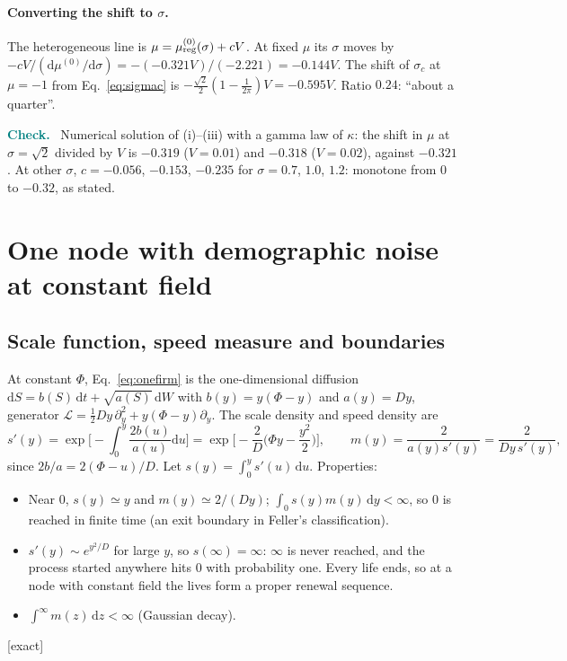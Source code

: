 \documentclass[11pt]{article}
\newcommand{\dd}{\mathrm d}
\newcommand{\exact}{\textsf{\small[exact]}}
\newenvironment{verify}{\par\medskip\noindent\textcolor{teal}{\textbf{Check.}}\ }{\par\medskip}
\begin{document}
\paragraph{Converting the shift to $\sigma$.}  The heterogeneous line is $\mu=\mu^{(0)}_{\rm reg}(\sigma)+cV$.  At fixed $\mu$ its $\sigma$
moves by $-cV/(\dd\mu^{(0)}/\dd\sigma)=-(-0.321V)/(-2.221)=-0.144V$.  The shift of $\sigma_c$ at $\mu=-1$ from Eq.~\eqref{eq:sigmac} is
$-\tfrac{\sqrt2}2(1-\tfrac1{2\pi})V=-0.595V$.  Ratio $0.24$: ``about a quarter''.

\begin{verify}
Numerical solution of (i)--(iii) with a gamma law of $\kappa$: the shift in $\mu$ at $\sigma=\sqrt2$ divided by $V$ is $-0.319$
($V=0.01$) and $-0.318$ ($V=0.02$), against $-0.321$.  At other $\sigma$, $c=-0.056$, $-0.153$, $-0.235$ for $\sigma=0.7$,
$1.0$, $1.2$: monotone from $0$ to $-0.32$, as stated.
\end{verify}

\section{One node with demographic noise at constant field}
\label{sec:constant}

\subsection{Scale function, speed measure and boundaries}

At constant $\Phi$, Eq.~\eqref{eq:onefirm} is the one-dimensional diffusion
$\dd S=b(S)\,\dd t+\sqrt{a(S)}\,\dd W$ with $b(y)=y(\Phi-y)$ and $a(y)=Dy$, generator
$\mathcal L=\tfrac12Dy\,\partial_y^2+y(\Phi-y)\partial_y$.  The scale density and speed density
\cite{karlintaylor1981} are
\begin{equation}
s'(y)=\exp\Big[-\int_0^y\frac{2b(u)}{a(u)}\dd u\Big]=\exp\Big[-\frac2D\Big(\Phi y-\frac{y^2}2\Big)\Big],\qquad
m(y)=\frac{2}{a(y)s'(y)}=\frac{2}{Dy\,s'(y)},
\end{equation}
since $2b/a=2(\Phi-u)/D$.  Let $s(y)=\int_0^ys'(u)\,\dd u$.  Properties:
\begin{itemize}
\item Near $0$, $s(y)\simeq y$ and $m(y)\simeq2/(Dy)$; $\int_0s(y)m(y)\,\dd y<\infty$, so $0$ is reached in finite time
  (an exit boundary in Feller's classification).
\item $s'(y)\sim e^{y^2/D}$ for large $y$, so $s(\infty)=\infty$: $\infty$ is never reached, and the process started anywhere
  hits $0$ with probability one.  Every life ends, so at a node with constant field the lives form a proper
  renewal sequence.
\item $\int^\infty m(z)\,\dd z<\infty$ (Gaussian decay).
\end{itemize}
\exact
\end{document}
